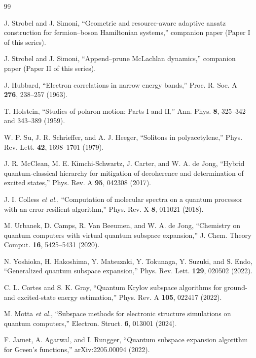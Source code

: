 \documentclass[
  reprint,
  amsmath,
  amssymb,
  aps,
  pra,
  nofootinbib,
  superscriptaddress,
  floatfix
]{revtex4-2}
\begin{document}
\begin{thebibliography}{99}

J. Strobel and J. Simoni,
``Geometric and resource-aware adaptive ansatz construction for fermion--boson Hamiltonian systems,''
companion paper (Paper I of this series).

J. Strobel and J. Simoni,
``Append--prune McLachlan dynamics,''
companion paper (Paper II of this series).

J. Hubbard,
``Electron correlations in narrow energy bands,''
Proc. R. Soc. A \textbf{276}, 238--257 (1963).

T. Holstein,
``Studies of polaron motion: Parts I and II,''
Ann. Phys. \textbf{8}, 325--342 and 343--389 (1959).

W. P. Su, J. R. Schrieffer, and A. J. Heeger,
``Solitons in polyacetylene,''
Phys. Rev. Lett. \textbf{42}, 1698--1701 (1979).

J. R. McClean, M. E. Kimchi-Schwartz, J. Carter, and W. A. de Jong,
``Hybrid quantum-classical hierarchy for mitigation of decoherence and determination of excited states,''
Phys. Rev. A \textbf{95}, 042308 (2017).

J. I. Colless \textit{et al.},
``Computation of molecular spectra on a quantum processor with an error-resilient algorithm,''
Phys. Rev. X \textbf{8}, 011021 (2018).

M. Urbanek, D. Camps, R. Van Beeumen, and W. A. de Jong,
``Chemistry on quantum computers with virtual quantum subspace expansion,''
J. Chem. Theory Comput. \textbf{16}, 5425--5431 (2020).

N. Yoshioka, H. Hakoshima, Y. Matsuzaki, Y. Tokunaga, Y. Suzuki, and S. Endo,
``Generalized quantum subspace expansion,''
Phys. Rev. Lett. \textbf{129}, 020502 (2022).

C. L. Cortes and S. K. Gray,
``Quantum Krylov subspace algorithms for ground- and excited-state energy estimation,''
Phys. Rev. A \textbf{105}, 022417 (2022).

M. Motta \textit{et al.},
``Subspace methods for electronic structure simulations on quantum computers,''
Electron. Struct. \textbf{6}, 013001 (2024).

F. Jamet, A. Agarwal, and I. Rungger,
``Quantum subspace expansion algorithm for Green's functions,''
arXiv:2205.00094 (2022).


\end{thebibliography}
\end{document}
